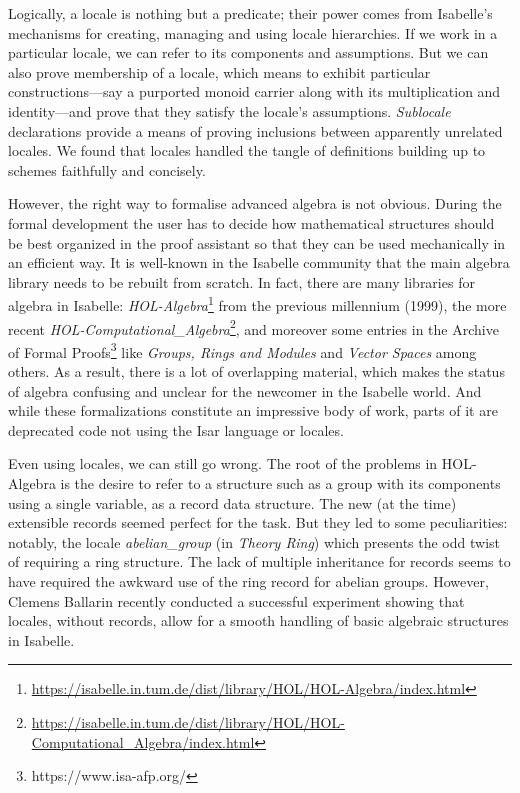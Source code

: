 \documentclass[12pt]{scrartcl}
\begin{document}
Logically, a locale is nothing but a predicate; their power comes from Isabelle's mechanisms for creating, managing and using locale hierarchies.
If we work in a particular locale, we can refer to its components and assumptions. But we can also prove membership of a locale, which means to exhibit particular constructions---say a purported monoid carrier along with its multiplication and identity---and prove that they satisfy the locale's assumptions. \emph{Sublocale} declarations provide a means of proving inclusions between apparently unrelated locales.
We found that locales handled the tangle of definitions building up to schemes faithfully and concisely.

However, the right way to formalise advanced algebra is not obvious. During the formal development the user has to decide how mathematical structures should be best organized in the proof assistant so that they can be used mechanically in an efficient way.
It is well-known in the Isabelle community that the main algebra library needs to be rebuilt from scratch. In fact, there are many libraries for algebra in Isabelle: \textit{HOL-Algebra}\footnote{\url{https://isabelle.in.tum.de/dist/library/HOL/HOL-Algebra/index.html}} from the previous millennium (1999), the more recent \textit{HOL-Computational\_Algebra}\footnote{\url{https://isabelle.in.tum.de/dist/library/HOL/HOL-Computational_Algebra/index.html}}, and moreover some entries in the Archive of Formal Proofs\footnote{https://www.isa-afp.org/} like \textit{Groups, Rings and Modules} \cite{Group-Ring-Module-AFP} and \textit{Vector Spaces} \cite{VectorSpace-AFP} among others. As a result, there is a lot of overlapping material, which makes the status of algebra confusing and unclear for the newcomer in the Isabelle world. And while these formalizations constitute an impressive body of work, parts of it are deprecated code not using the Isar language or locales. 

Even using locales, we can still go wrong. The root of the problems in HOL-Algebra is the desire to refer to a structure such as a group with its components using a single variable, as a record data structure. The new (at the time) extensible records seemed perfect for the task.
But they led to some peculiarities: notably, the locale \emph{abelian\_group} (in \textit{Theory Ring}) which presents the odd twist of requiring a ring structure. The lack of multiple inheritance for records seems to have required the awkward use of the ring record for abelian groups. However, Clemens Ballarin recently conducted a successful experiment \cite{ballarin-exploring} showing that  locales, without records, allow for a smooth handling of basic algebraic structures in Isabelle. 
\end{document}
